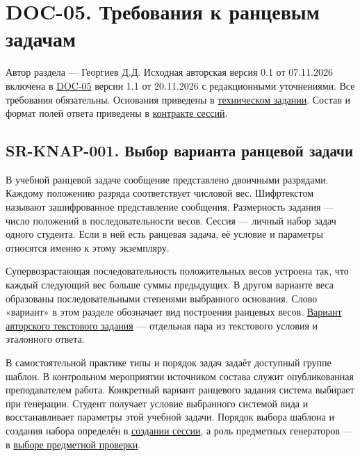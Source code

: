 \documentclass[12pt,a4paper]{article}
\begin{document}
\section{DOC-05. Требования к ранцевым задачам}\label{doc-05-ux442ux440ux435ux431ux43eux432ux430ux43dux438ux44f-ux43a-ux440ux430ux43dux446ux435ux432ux44bux43c-ux437ux430ux434ux430ux447ux430ux43c}

\hypertarget{doc-05-требования-к-ранцевым-задачам}{}

Автор раздела --- Георгиев Д.Д. Исходная авторская версия 0.1 от 07.11.2026 включена в {\hyperlink{doc-05-системные-требования}{DOC-05}} версии 1.1 от 20.11.2026 с редакционными уточнениями. Все требования обязательны. Основания приведены в {\href{../02\_Техническое\_задание/Техническое\_задание.pdf\#doc-02-техническое-задание}{техническом задании}}. Состав и формат полей ответа приведены в {\href{../07\_Программные\_требования/DOC-06.2\_Сессии\_задач\_и\_планировщик.pdf\#ранцевая-задача}{контракте сессий}}.

\subsection{SR-KNAP-001. Выбор варианта ранцевой задачи}\label{sr-knap-001-ux432ux44bux431ux43eux440-ux432ux430ux440ux438ux430ux43dux442ux430-ux440ux430ux43dux446ux435ux432ux43eux439-ux437ux430ux434ux430ux447ux438}

\hypertarget{sr-knap-001-выбор-варианта-ранцевой-задачи}{}

\hypertarget{sr-knap-001}{}

В учебной ранцевой задаче сообщение представлено двоичными разрядами. Каждому положению разряда соответствует числовой вес. Шифртекстом называют зашифрованное представление сообщения. Размерность задания --- число положений в последовательности весов. Сессия --- личный набор задач одного студента. Если в ней есть ранцевая задача, её условие и параметры относятся именно к этому экземпляру.

Супервозрастающая последовательность положительных весов устроена так, что каждый следующий вес больше суммы предыдущих. В другом варианте веса образованы последовательными степенями выбранного основания. Слово «вариант» в этом разделе обозначает вид построения ранцевых весов. {\hyperlink{sr-cfg-006-авторское-задание-с-вариантами}{Вариант авторского текстового задания}} --- отдельная пара из текстового условия и эталонного ответа.

В самостоятельной практике типы и порядок задач задаёт доступный группе шаблон. В контрольном мероприятии источником состава служит опубликованная преподавателем работа. Конкретный вариант ранцевого задания система выбирает при генерации. Студент получает условие выбранного системой вида и восстанавливает параметры этой учебной задачи. Порядок выбора шаблона и создания набора определён в {\hyperlink{sr-ses-001-создание-набора-по-шаблону-группы}{создании сессии}}, а роль предметных генераторов --- в {\hyperlink{sr-ses-004-выбор-предметной-проверки}{выборе предметной проверки}}.
\end{document}
